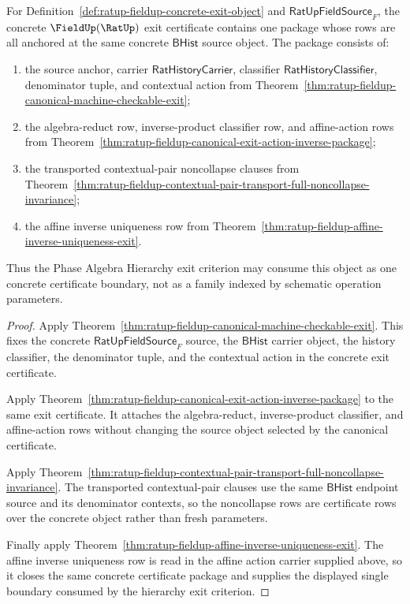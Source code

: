 \begin{theorem}
\label{thm:ratup-fieldup-final-certificate-noncollapse-action-package}
For Definition~\ref{def:ratup-fieldup-concrete-exit-object} and
$\mathsf{RatUpFieldSource}_F$, the concrete $\FieldUp(\RatUp)$ exit certificate
contains one package whose rows are all anchored at the same concrete
$\mathsf{BHist}$ source object. The package consists of:
\begin{enumerate}
  \item the source anchor, carrier $\mathsf{RatHistoryCarrier}$, classifier
  $\mathsf{RatHistoryClassifier}$, denominator tuple, and contextual action from
  Theorem~\ref{thm:ratup-fieldup-canonical-machine-checkable-exit};
  \item the algebra-reduct row, inverse-product classifier row, and affine-action
  rows from
  Theorem~\ref{thm:ratup-fieldup-canonical-exit-action-inverse-package};
  \item the transported contextual-pair noncollapse clauses from
  Theorem~\ref{thm:ratup-fieldup-contextual-pair-transport-full-noncollapse-invariance};
  \item the affine inverse uniqueness row from
  Theorem~\ref{thm:ratup-fieldup-affine-inverse-uniqueness-exit}.
\end{enumerate}
Thus the Phase Algebra Hierarchy exit criterion may consume this object as one
concrete certificate boundary, not as a family indexed by schematic operation
parameters.
\end{theorem}
\begin{proof}
Apply
Theorem~\ref{thm:ratup-fieldup-canonical-machine-checkable-exit}. This fixes the
concrete $\mathsf{RatUpFieldSource}_F$ source, the $\mathsf{BHist}$ carrier
object, the history classifier, the denominator tuple, and the contextual
action in the concrete exit certificate.

Apply
Theorem~\ref{thm:ratup-fieldup-canonical-exit-action-inverse-package} to the
same exit certificate. It attaches the algebra-reduct, inverse-product
classifier, and affine-action rows without changing the source object selected
by the canonical certificate.

Apply
Theorem~\ref{thm:ratup-fieldup-contextual-pair-transport-full-noncollapse-invariance}.
The transported contextual-pair clauses use the same $\mathsf{BHist}$ endpoint
source and its denominator contexts, so the noncollapse rows are certificate
rows over the concrete object rather than fresh parameters.

Finally apply
Theorem~\ref{thm:ratup-fieldup-affine-inverse-uniqueness-exit}. The affine
inverse uniqueness row is read in the affine action carrier supplied above, so
it closes the same concrete certificate package and supplies the displayed
single boundary consumed by the hierarchy exit criterion.
\end{proof}

